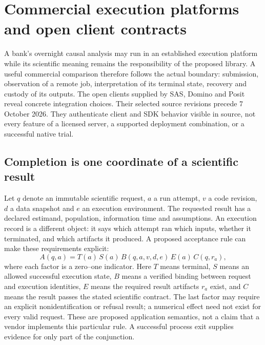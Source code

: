 \section{Commercial execution platforms and open client contracts}
\label{exec23:clients-scope}

A bank's overnight causal analysis may run in an established execution
platform while its scientific meaning remains the responsibility of the
proposed library. A useful commercial comparison therefore follows the
actual boundary: submission, observation of a remote job, interpretation of
its terminal state, recovery and custody of its outputs. The open clients
supplied by SAS, Domino and Posit reveal concrete integration choices. Their
selected source revisions precede 7 October 2026. They authenticate client
and SDK behavior visible in source, not every feature of a licensed server,
a supported deployment combination, or a successful native trial.
\citep{exec23_workflow_sasctl,exec23_workflow_dominopy,
exec23_workflow_connectapi,exec23_workflow_positgo}

\subsection{Completion is one coordinate of a scientific result}
\label{exec23:clients-completion}

Let $q$ denote an immutable scientific request, $a$ a run attempt, $v$ a code
revision, $d$ a data snapshot and $e$ an execution environment. The requested
result has a declared estimand, population, information time and assumptions.
An execution record is a different object: it says which attempt ran which
inputs, whether it terminated, and which artifacts it produced. A proposed
acceptance rule can make these requirements explicit:
\begin{equation}
 A(q,a)=T(a)\,S(a)\,B(q,a,v,d,e)\,E(a)\,C(q,r_a),
 \label{exec23:clients-acceptance}
\end{equation}
where each factor is a zero--one indicator. Here $T$ means terminal, $S$
means an allowed successful execution state, $B$ means a verified binding
between request and execution identities, $E$ means the required result
artifacts $r_a$ exist, and $C$ means the result passes the stated scientific
contract. The last factor may require an explicit nonidentification or
refusal result; a numerical effect need not exist for every valid request.
These are proposed application semantics, not a claim that a vendor implements
this particular rule. A successful process exit supplies evidence for only
part of the conjunction.

